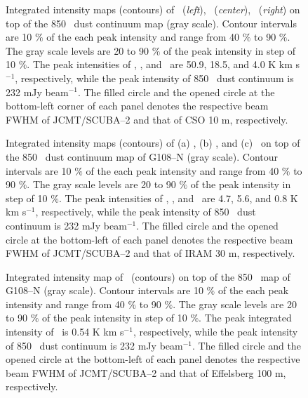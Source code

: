 \documentclass[manuscript]{aastex}
\begin{document}
\clearpage

\begin{figure}[!p]
\begin{center}

\caption{Integrated intensity maps (contours) of \tcot\ (\textit{left}), \thcot\ (\textit{center}), \ceot\ (\textit{right}) on top of the 850 \m\ dust continuum map (gray scale).
Contour intervals are 10 $\%$ of the each peak intensity and range from 40 $\%$ to 90 $\%$.
The gray scale levels are 20 to 90 $\%$ of the peak intensity in step of 10 $\%$.
The peak intensities of \tcot, \thcot, and \ceot\ are 50.9, 18.5, and 4.0 K km s$^{-1}$, respectively, while the peak intensity of 850 \m\ dust continuum is 232 mJy beam$^{-1}$.
The filled circle and the opened circle at the bottom-left corner of each panel denotes the respective beam FWHM of JCMT/SCUBA--2 and that of CSO 10 m, respectively.}
\end{center}
\end{figure}
\clearpage

\begin{figure}[!p]
\begin{center}
\caption{Integrated intensity maps (contours) of (a) \hcop, (b) \hcn, and (c) \hcopf\ on top of the 850 \m\ dust continuum map of G108--N (gray scale).
Contour intervals are 10 $\%$ of the each peak intensity and range from 40 $\%$ to 90 $\%$.
The gray scale levels are 20 to 90 $\%$ of the peak intensity in step of 10 $\%$.
The peak intensities of \hcop, \hcn, and \hcopf\ are 4.7, 5.6, and 0.8 K km s$^{-1}$, respectively, while the peak intensity of 850 \m\ dust continuum is 232 mJy beam$^{-1}$.
The filled circle and the opened circle at the bottom-left of each panel denotes the respective beam FWHM of JCMT/SCUBA--2 and that of IRAM 30 m, respectively.}
\end{center}
\end{figure}
\clearpage



\begin{figure}[!p]
\begin{center}
\caption{Integrated intensity map of \nht\ (contours) on top of the 850 \m\ map of G108--N (gray scale).
Contour intervals are 10 $\%$ of the each peak intensity and range from 40 $\%$ to 90 $\%$.
The gray scale levels are 20 to 90 $\%$ of the peak intensity in step of 10 $\%$.
The peak integrated intensity of \nht\ is 0.54 K km s$^{-1}$, respectively, while the peak intensity of 850 \m\ dust continuum is 232 mJy beam$^{-1}$.
The filled circle and the opened circle at the bottom-left of each panel denotes the respective beam FWHM of JCMT/SCUBA--2 and that of Effelsberg 100 m, respectively.}
\end{center}
\end{figure}
\clearpage
\end{document}
